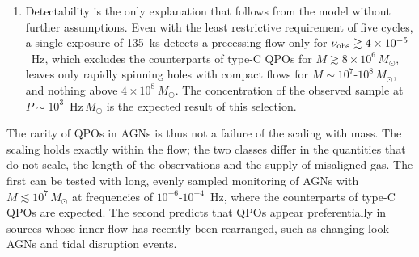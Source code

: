 \begin{enumerate}
    \item Detectability is the only explanation that follows from the model without further assumptions.
    Even with the least restrictive requirement of five cycles, a single exposure of 135~ks detects a precessing flow only for $\nu_\textup{obs}\gtrsim4\times10^{-5}$~Hz, which excludes the counterparts of type-C QPOs for $M\gtrsim8\times10^6\,M_\odot$, leaves only rapidly spinning holes with compact flows for $M\sim10^7$-$10^8\,M_\odot$, and nothing above $4\times10^8\,M_\odot$.
    The concentration of the observed sample at $P\sim10^3$~Hz\,$M_\odot$ is the expected result of this selection.
\end{enumerate}
The rarity of QPOs in AGNs is thus not a failure of the scaling with mass.
The scaling holds exactly within the flow; the two classes differ in the quantities that do not scale, the length of the observations and the supply of misaligned gas.
The first can be tested with long, evenly sampled monitoring of AGNs with $M\lesssim10^7\,M_\odot$ at frequencies of $10^{-6}$-$10^{-4}$~Hz, where the counterparts of type-C QPOs are expected.
The second predicts that QPOs appear preferentially in sources whose inner flow has recently been rearranged, such as changing-look AGNs and tidal disruption events.